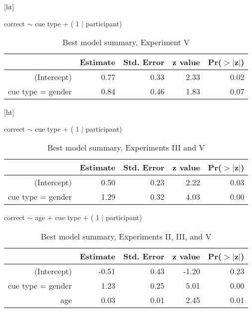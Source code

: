 \documentclass{frontiersSCNS} %
\begin{document}
\vspace{1cm}[ht]

\begin{table}[ht]
correct $\sim$ cue type + ( 1 $|$ participant)\\
\centering
\begin{tabular}{rrrrr}
  \hline
 & Estimate & Std. Error & z value & Pr($>$$|$z$|$) \\ 
  \hline
(Intercept) & 0.77 & 0.33 & 2.33 & 0.02 \\ 
  cue type = gender & 0.84 & 0.46 & 1.83 & 0.07 \\ 
   \hline
\end{tabular}
\caption{ \large  Best model summary, Experiment V}
\label{exp5model}
\end{table}

\vspace{1cm}[ht]

\begin{table}[ht]
correct $\sim$ cue type + ( 1 $|$ participant)\\
\centering
\begin{tabular}{rrrrr}
  \hline
 & Estimate & Std. Error & z value & Pr($>$$|$z$|$) \\ 
  \hline
(Intercept) & 0.50 & 0.23 & 2.22 & 0.03 \\ 
  cue type = gender & 1.29 & 0.32 & 4.03 & 0.00 \\ 
   \hline
\end{tabular}
\caption{ \large  Best model summary, Experiments III and V}
\label{exp35model}
\end{table}

\vspace{1cm}

\begin{table}[ht]
correct $\sim$ age + cue type + ( 1 $|$ participant)\\
\centering
\begin{tabular}{rrrrr}
  \hline
 & Estimate & Std. Error & z value & Pr($>$$|$z$|$) \\ 
  \hline
(Intercept) & -0.51 & 0.43 & -1.20 & 0.23 \\ 
  cue type = gender & 1.23 & 0.25 & 5.01 & 0.00 \\ 
  age & 0.03 & 0.01 & 2.45 & 0.01 \\ 
   \hline
\end{tabular}
\caption{ \large  Best model summary, Experiments II, III, and V}
\label{exp235model}
\end{table}
\end{document}

